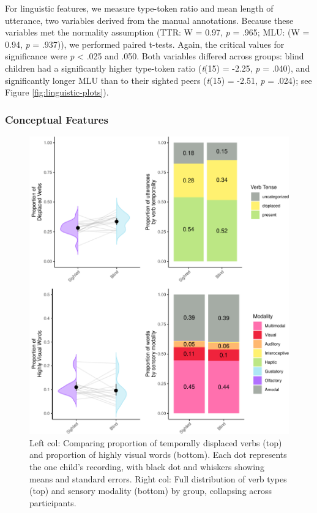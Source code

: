 \documentclass[
  man]{apa6}
\begin{document}
For linguistic features, we measure type-token ratio and mean length of utterance, two variables derived from the manual annotations. Because these variables met the normality assumption (TTR: W = 0.97, \emph{p} = .965; MLU: (W = 0.94, \emph{p} = .937)), we performed paired t-tests. Again, the critical values for significance were \emph{p} \textless{} .025 and .050. Both variables differed across groups: blind children had a significantly higher type-token ratio (\emph{t}(15) = -2.25, \emph{p} = .040), and significantly longer MLU than to their sighted peers (\emph{t}(15) = -2.51, \emph{p} = .024); see Figure \ref{fig:linguistic-plots}).

\hypertarget{conceptual-features-1}{%
\subsubsection{Conceptual Features}\label{conceptual-features-1}}

\begin{figure}
\centering
\includegraphics{input_quality_manuscript_files/figure-latex/conceptual-plots-1.pdf}
\caption{\label{fig:conceptual-plots}Left col: Comparing proportion of temporally displaced verbs (top) and proportion of highly visual words (bottom). Each dot represents the one child's recording, with black dot and whiskers showing means and standard errors. Right col: Full distribution of verb types (top) and sensory modality (bottom) by group, collapsing across participants.}
\end{figure}
\end{document}
